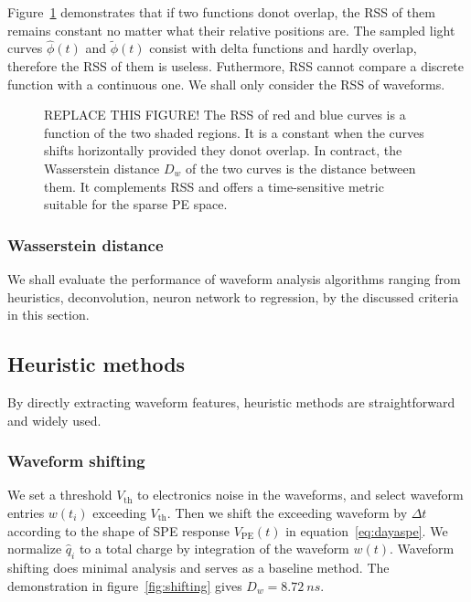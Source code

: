 Figure~\ref{fig:l2} demonstrates that if two functions donot overlap, the RSS of them remains constant no matter what their relative positions are.  The sampled light curves $\hat{\phi}(t)$ and $\tilde{\phi}(t)$ consist with delta functions and hardly overlap, therefore the RSS of them is useless.  Futhermore, RSS cannot compare a discrete function with a continuous one.  We shall only consider the RSS of waveforms.

\begin{figure}[H]
  \centering
  \resizebox{\textwidth}{!}{}
  \caption{\label{fig:l2} REPLACE THIS FIGURE!  The RSS of red and blue curves is a function of the two shaded regions. It is a constant when the curves shifts horizontally provided they donot overlap.  In contract, the Wasserstein distance $D_w$ of the two curves is the distance between them.  It complements RSS and offers a time-sensitive metric suitable for the sparse PE space.}
\end{figure}

\subsubsection{Wasserstein distance}
\label{sec:W-dist}



We shall evaluate the performance of waveform analysis algorithms ranging from heuristics, deconvolution, neuron network to regression, by the discussed criteria in this section.

\subsection{Heuristic methods}
By directly extracting waveform features, heuristic methods are straightforward and widely used. 

\subsubsection{Waveform shifting}
\label{sec:shifting}
We set a threshold $V_\mathrm{th}$ to electronics noise in the waveforms, and select waveform entries $w(t_i)$ exceeding $V_\mathrm{th}$. Then we shift the exceeding waveform by $\Delta t$ according to the shape of SPE response $V_\mathrm{PE}(t)$ in equation~\eqref{eq:dayaspe}. We normalize $\hat{q}_i$ to a total charge by integration of the waveform $w(t)$. Waveform shifting does minimal analysis and serves as a baseline method. The demonstration in figure~\ref{fig:shifting} gives $D_w = \SI{8.72}{ns}$.

